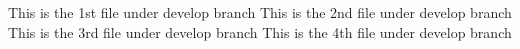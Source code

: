 This is the 1st file under develop branch
This is the 2nd file under develop branch
This is the 3rd file under develop branch
This is the 4th file under develop branch
